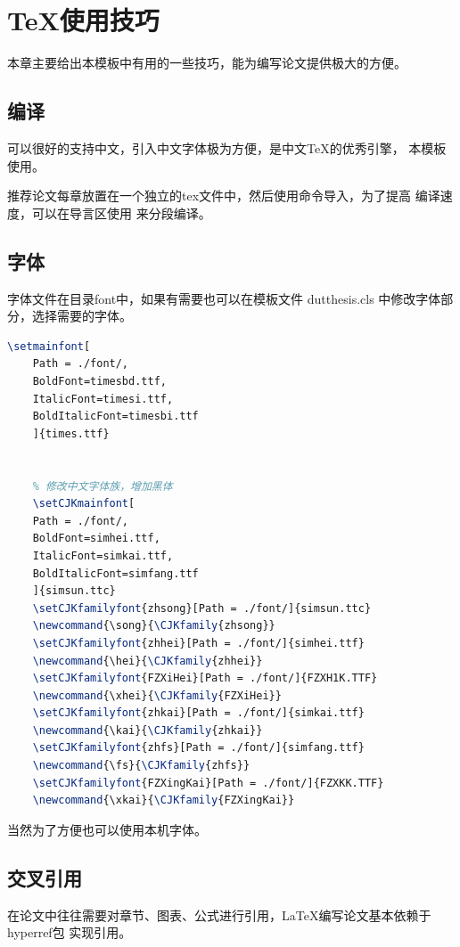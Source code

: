 \chapter{\TeX 使用技巧}
\begin{Sketch}
    本章主要给出本模板中有用的一些技巧，能为编写论文提供极大的方便。
\end{Sketch}
\section{编译}
\label{sec:compile}
    \XeLaTeX 可以很好的支持中文，引入中文字体极为方便，是中文\TeX 的优秀引擎，
    本模板使用\XeLaTeX 。

推荐论文每章放置在一个独立的tex文件中，然后使用\verb||命令导入，为了提高
编译速度，可以在导言区使用 \verb||
来分段编译。

\section{字体}
\label{sec:font}
    字体文件在目录font中，如果有需要也可以在模板文件
    dutthesis.cls 中修改字体部分，选择需要的字体。
    \begin{lstlisting}[language=TeX]
	\setmainfont[
	Path = ./font/,
	BoldFont=timesbd.ttf,
	ItalicFont=timesi.ttf,
	BoldItalicFont=timesbi.ttf
	]{times.ttf}


	% 修改中文字体族，增加黑体
	\setCJKmainfont[
	Path = ./font/,
	BoldFont=simhei.ttf,
	ItalicFont=simkai.ttf,
	BoldItalicFont=simfang.ttf
	]{simsun.ttc}
	\setCJKfamilyfont{zhsong}[Path = ./font/]{simsun.ttc}
	\newcommand{\song}{\CJKfamily{zhsong}}
	\setCJKfamilyfont{zhhei}[Path = ./font/]{simhei.ttf}
	\newcommand{\hei}{\CJKfamily{zhhei}}
	\setCJKfamilyfont{FZXiHei}[Path = ./font/]{FZXH1K.TTF}
	\newcommand{\xhei}{\CJKfamily{FZXiHei}}
	\setCJKfamilyfont{zhkai}[Path = ./font/]{simkai.ttf}
	\newcommand{\kai}{\CJKfamily{zhkai}}
	\setCJKfamilyfont{zhfs}[Path = ./font/]{simfang.ttf}
	\newcommand{\fs}{\CJKfamily{zhfs}}
	\setCJKfamilyfont{FZXingKai}[Path = ./font/]{FZXKK.TTF}
	\newcommand{\xkai}{\CJKfamily{FZXingKai}}
    \end{lstlisting}
当然为了方便也可以使用本机字体。



\section{交叉引用}
\label{sec:cross-reference}
在论文中往往需要对章节、图表、公式进行引用，\LaTeX 编写论文基本依赖于hyperref包
实现引用。


